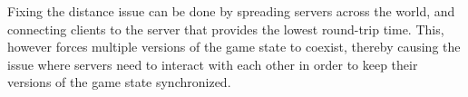 \documentclass[bsc, 12pt, twoside, singlespacing, parskip, abbrevs, notimes, normalheadings, logo]{styles/infthesis}
\begin{document}
Fixing the distance issue can be done by spreading servers across the world, and connecting clients to the server that provides the lowest round-trip time. This, however forces multiple versions of the game state to coexist, thereby causing the issue where servers need to interact with each other in order to keep their versions of the game state synchronized.









\end{document}
